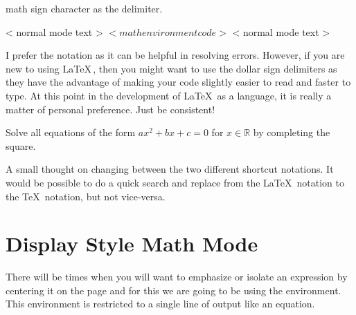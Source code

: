 \begin{docEnvironment*}[doclang/environment content=mathematics content goes here]{math}{}{}
sign character as the delimiter.
\begin{dispListing}
< normal mode text > $ < math environment code > $ < normal mode text > 
\end{dispListing}
I prefer the \cs{(}  \cs{)} notation as it can be helpful
in resolving errors.  However, if you are new to using \LaTeX\,, then you might
want to use the dollar sign delimiters as they have the advantage of making 
your code slightly easier to read and faster to type.  At this point in the 
development of \LaTeX\, as a language, it is really a matter of personal 
preference.  Just be consistent!
\begin{dispExample}
Solve all equations of the form $ ax^2 + bx + c = 0 $ for 
$ x \in \mathbb{R} $ by completing the square.
\end{dispExample}
A small thought on changing between the two different shortcut notations. It 
would be possible to do a quick search and replace from the \LaTeX\, notation to 
the \TeX\, notation, but not vice-versa. 
\end{docEnvironment*}

\section{Display Style Math Mode}

There will be times when you will want to emphasize or isolate an expression
by centering it on the page and for this we are going to be using the 
 environment. This environment is restricted to 
a single line of output like an equation.

